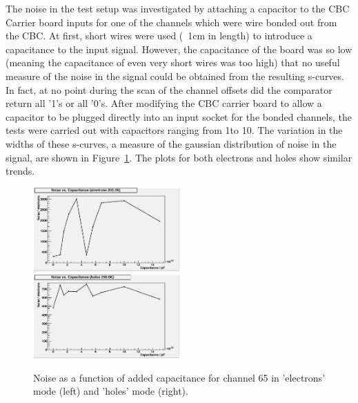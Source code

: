 The noise in the test setup was investigated by attaching a capacitor to the CBC Carrier board inputs for one
of the channels which were wire bonded out from the CBC. At first, short wires were used (~1cm in length) to
introduce a capacitance to the input signal. However, the capacitance of the board was so low (meaning the
capacitance of even very short wires was too high) that no useful measure of the noise in the signal could be
obtained from the resulting s-curves. In fact, at no point during the scan of the channel offsets did the
comparator return all '1's or all '0's. After modifying the CBC carrier board to allow a capacitor to be
plugged directly into an input socket for the bonded channels, the tests were carried out with capacitors
ranging from 1\pF to 10\pF. The variation in the widths of these s-curves, a measure of the gaussian
distribution of noise in the signal, are shown in Figure~\ref{fig:noise_v_capacitance}. The plots for both
electrons and holes show similar trends.

\begin{figure}[hbtp]
   \centering
     \includegraphics[width=0.5\textwidth]{Chapters/07_Appendices/07c_2_Images/noise_v_capacitance_ch_65_electrons}\hfill
     \includegraphics[width=0.5\textwidth]{Chapters/07_Appendices/07c_2_Images/noise_v_capacitance_ch_65_holes}\hfill
     \caption{Noise as a function of added capacitance for channel 65 in 'electrons' mode (left) and 'holes'
     mode (right).}
     \label{fig:noise_v_capacitance}
\end{figure}

